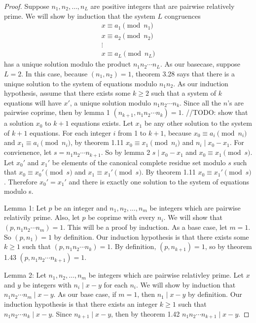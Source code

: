 \documentclass[12pt,leqno]{article}
\numberwithin{equation}{section}
\theoremstyle{definition}
\begin{document}
\begin{proof}[Proof]
Suppose $n_1, n_2, \hdots, n_L$ are positive integers that are pairwise relatively prime.  We will show by induction that the system $L$ congruences
\[ \begin{array}{c}
x \equiv a_1 \pmod{n_1} \\
x \equiv a_2 \pmod{n_2} \\
\vdots \\
x \equiv a_L \pmod{n_L} \end{array} \]
has a unique solution modulo the product $n_1 n_2 \cdots n_L$.  As our basecase, suppose $L = 2$.  In this case, because $(n_1, n_2) = 1$, theorem 3.28 says that there is a unique solution to the system of equations modulo $n_1 n_2$.  As our induction hypothesis, assume that there exists some $k \geq 2$ such that a system of $k$ equations will have $x'$, a unique solution modulo $n_1 n_2 \cdots n_k$.  Since all the $n$'s are pairwise coprime, then by lemma 1 $(n_{k+1}, n_1 n_2 \cdots n_k) = 1$.  //TODO: show that a solution $x_0$ to $k+1$ equations exists.  Let $x_1$ be any other solution to the system of $k+1$ equations.  For each integer $i$ from 1 to $k+1$, because $x_0 \equiv a_i \pmod{n_i}$ and $x_1 \equiv a_i \pmod{n_i}$, by theorem 1.11 $x_0 \equiv x_1 \pmod{n_i}$ and $n_i \mid x_0 - x_1$.  For convienence, let $s = n_1 n_2 \cdots n_{k+1}$.  So by lemma 2 $s \mid x_0 - x_1$ and $x_0 \equiv x_1 \pmod{s}$.  Let $x_0'$ and $x_1'$ be elements of the canonical complete residue set modulo $s$ such that $x_0 \equiv x_0' \pmod{s}$ and $x_1 \equiv x_1' \pmod{s}$.  By theorem 1.11 $x_0 \equiv x_1' \pmod{s}$.  Therefore $x_0' = x_1'$ and there is exactly one solution to the system of equations modulo s.


Lemma 1: Let $p$ be an integer and $n_1, n_2, \ldots , n_m$ be integers which are pairwise relativily prime.  Also, let $p$ be coprime with every $n_i$.  We will show that $(p, n_1 n_2 \cdots n_m) = 1$.  This will be a proof by induction.  As a base case, let $m = 1$.  So $(p, n_1) = 1$ by definition.  Our induction hypothesis is that there exists some $k \geq 1$ such that $(p, n_1 n_2 \cdots n_k) = 1$.  By definition, $(p, n_{k+1}) = 1$, so by theorem 1.43 $(p, n_1 n_2 \cdots n_{k+1}) = 1$. 


Lemma 2: Let $n_1, n_2, \ldots, n_m$ be integers which are pairwise relativley prime.  Let $x$ and $y$ be integers with $n_i \mid x - y$ for each $n_i$.  We will show by induction that $n_1 n_2 \cdots n_m \mid x - y$.  As our base case, if $m = 1$, then $n_1 \mid x - y$ by definition.  Our induction hypothesis is that there exists an integer $k \geq 1$ such that $n_1 n_2 \cdots n_k \mid x - y$.  Since $n_{k+1} \mid x - y$, then by theorem 1.42 $n_1 n_2 \cdots n_{k+1} \mid x - y$.
\end{proof}
\end{document}
